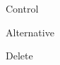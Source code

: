 \begin{acronym}
  {Control}
\end{acronym}

\begin{acronym}
  {Alternative}
\end{acronym}

\begin{acronym}
  {Delete}
\end{acronym}







